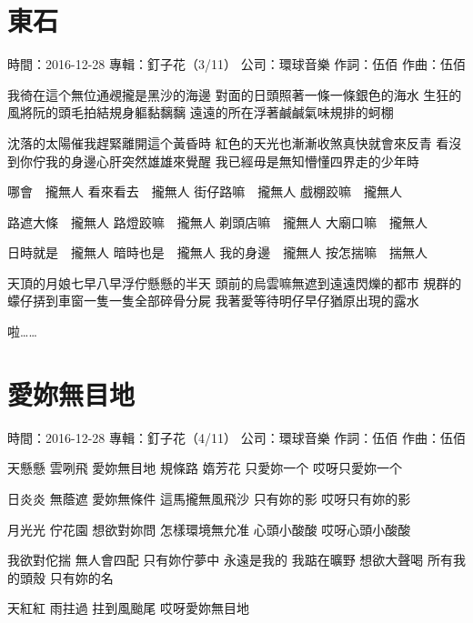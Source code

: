 \documentclass[UTF8,a4paper,oneside,twocolumn,12pt]{ctexbook}
\newcommand{\infopair}[2]{\textbullet #1：#2}
\newcommand{\zc}[1][伍佰]{\infopair{作詞}{#1}}
\newcommand{\zq}[1][伍佰]{\infopair{作曲}{#1}}
\newcommand{\zj}[1]{\infopair{專輯}{#1}}
\newcommand{\sj}[1]{\infopair{時間}{#1}}
\newcommand{\gs}[1]{\infopair{公司}{#1}}
\newenvironment{info}{\begin{flushleft}\kaishu
	}
	{\end{flushleft}\normalsize\yahei\par}
\newenvironment{lyric}{
	}
{}
\begin{document}
\section{東石}
\begin{info}
	\sj{2016-12-28}
	\zj{釘子花（3/11）}
	\gs{環球音樂}
	\zc
	\zq
\end{info}
\begin{lyric}
	我徛在這个無位通覕攏是黑沙的海邊
	對面的日頭照著一條一條銀色的海水
	生狂的風將阮的頭毛拍結規身軀黏黐黐
	遠遠的所在浮著鹹鹹氣味規排的蚵棚

	沈落的太陽催我趕緊離開這个黃昏時
	紅色的天光也漸漸收煞真快就會來反青
	看沒到你佇我的身邊心肝突然雄雄來覺醒
	我已經毋是無知懵懂四界走的少年時

	哪會　攏無人
	看來看去　攏無人
	街仔路嘛　攏無人
	戲棚跤嘛　攏無人

	路遮大條　攏無人
	路燈跤嘛　攏無人
	剃頭店嘛　攏無人
	大廟口嘛　攏無人

	日時就是　攏無人
	暗時也是　攏無人
	我的身邊　攏無人
	按怎揣嘛　揣無人

	天頂的月娘七早八早浮佇懸懸的半天
	頭前的烏雲嘛無遮到遠遠閃爍的都市
	規群的蠓仔挵到車窗一隻一隻全部碎骨分屍
	我著愛等待明仔早仔猶原出現的露水

	啦……
\end{lyric}

\section{愛妳無目地}
\begin{info}
	\sj{2016-12-28}
	\zj{釘子花（4/11）}
	\gs{環球音樂}
	\zc
	\zq
\end{info}
\begin{lyric}
	天懸懸 雲咧飛
	愛妳無目地
	規條路 媠芳花
	只愛妳一个 哎呀只愛妳一个

	日炎炎 無蔭遮
	愛妳無條件
	這馬攏無風飛沙
	只有妳的影 哎呀只有妳的影

	月光光 佇花園
	想欲對妳問
	怎樣環境無允准
	心頭小酸酸 哎呀心頭小酸酸

	我欲對佗揣 無人會四配
	只有妳佇夢中 永遠是我的
	我踮在曠野 想欲大聲喝
	所有我的頭殼 只有妳的名

	天紅紅 雨拄過
	拄到風颱尾 哎呀愛妳無目地
\end{lyric}
\end{document}
